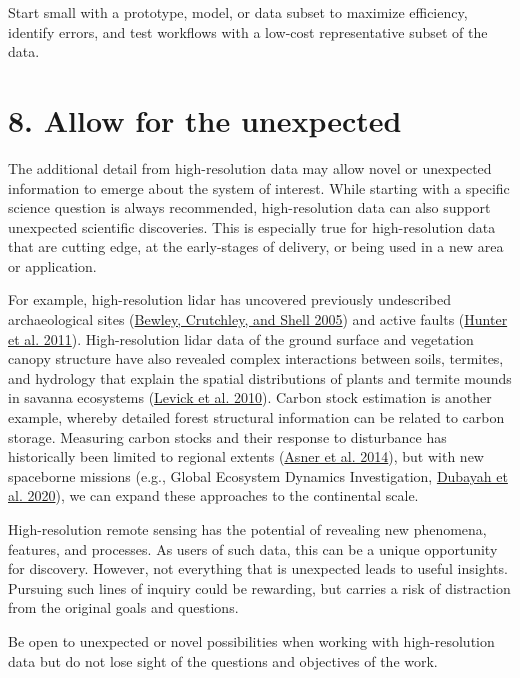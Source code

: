 \documentclass[
  12pt,
]{article}
\begin{document}
Start small with a prototype, model, or data subset to maximize
efficiency, identify errors, and test workflows with a low-cost
representative subset of the data.

\hypertarget{allow-for-the-unexpected}{%
\section{8. Allow for the unexpected}\label{allow-for-the-unexpected}}

The additional detail from high-resolution data may allow novel or
unexpected information to emerge about the system of interest. While
starting with a specific science question is always recommended,
high-resolution data can also support unexpected scientific discoveries.
This is especially true for high-resolution data that are cutting edge,
at the early-stages of delivery, or being used in a new area or
application.

For example, high-resolution lidar has uncovered previously undescribed
archaeological sites (\protect\hyperlink{ref-bewley2005new}{Bewley,
Crutchley, and Shell 2005}) and active faults
(\protect\hyperlink{ref-hunter2011lidar}{Hunter et al. 2011}).
High-resolution lidar data of the ground surface and vegetation canopy
structure have also revealed complex interactions between soils,
termites, and hydrology that explain the spatial distributions of plants
and termite mounds in savanna ecosystems
(\protect\hyperlink{ref-levick2010regional}{Levick et al. 2010}). Carbon
stock estimation is another example, whereby detailed forest structural
information can be related to carbon storage. Measuring carbon stocks
and their response to disturbance has historically been limited to
regional extents (\protect\hyperlink{ref-asner2014targeted}{Asner et al.
2014}), but with new spaceborne missions (e.g., Global Ecosystem
Dynamics Investigation,
\protect\hyperlink{ref-dubayah2020global}{Dubayah et al. 2020}), we can
expand these approaches to the continental scale.

High-resolution remote sensing has the potential of revealing new
phenomena, features, and processes. As users of such data, this can be a
unique opportunity for discovery. However, not everything that is
unexpected leads to useful insights. Pursuing such lines of inquiry
could be rewarding, but carries a risk of distraction from the original
goals and questions.

Be open to unexpected or novel possibilities when working with
high-resolution data but do not lose sight of the questions and
objectives of the work.
\end{document}
